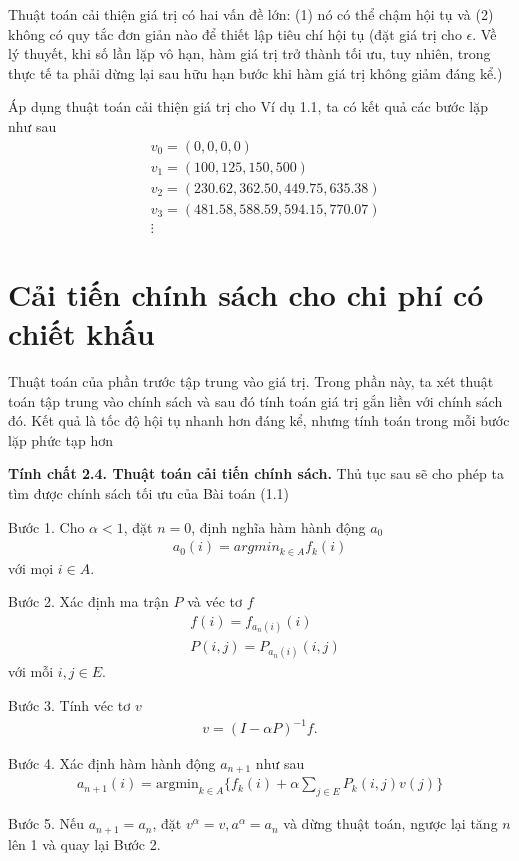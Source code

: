 \documentclass[12pt,a4paper]{report}
\begin{document}
  
   \selectfont
  Thuật toán cải thiện giá trị có hai vấn đề lớn: (1) nó có thể chậm hội tụ và (2) không có quy tắc đơn giản nào để thiết lập tiêu chí hội tụ (đặt giá trị cho $\epsilon$. Về lý thuyết, khi số lần lặp vô hạn, hàm giá trị trở thành tối ưu, tuy nhiên, trong thực tế ta phải dừng lại sau hữu hạn bước khi hàm giá trị không giảm đáng kể.)
  
  \medskip
  Áp dụng thuật toán cải thiện giá trị cho Ví dụ 1.1, ta có kết quả các bước lặp như sau
  \begin{align*}
  &v_0=(0,0,0,0)\\
  &v_1=(100,125,150,500)\\
  &v_2=(230.62, 362.50, 449.75, 635.38)\\
  &v_3=(481.58, 588.59, 594.15, 770.07)\\
  &\vdots
  \end{align*}
  
  \section{Cải tiến chính sách cho chi phí có chiết khấu}
  Thuật toán của phần trước tập trung vào giá trị. Trong phần này, ta xét thuật toán tập trung vào chính sách và sau đó tính toán giá trị gắn liền với chính sách đó. Kết quả là tốc độ hội tụ nhanh hơn đáng kể, nhưng tính toán trong mỗi bước lặp phức tạp hơn
  
  \begin{shaded*}
  	\noindent
  	\textbf{Tính chất 2.4. {Thuật toán cải tiến chính sách}.}
  	\selectfont 
  	Thủ tục sau sẽ cho phép ta tìm được chính sách tối ưu của Bài toán (1.1)
  	
  	\medskip
  	\noindent
  	Bước 1. Cho $\alpha <1$, đặt $n=0$, định nghĩa hàm hành động $a_0$
  	\begin{align*}
  	a_0(i)=argmin_{k \in A}f_k(i)
  	\end{align*}
  	với mọi $i \in A$.
  	
  	\medskip
  	\noindent
  	Bước 2. Xác định ma trận $P$ và véc tơ $f$
  	\begin{align*}
  	&f(i)=f_{a_n(i)}(i)\\
  	&P(i,j)=P_{a_n(i)}(i,j)
  	\end{align*} 
  	với mỗi $i,j \in E$.
  	
  	\medskip
  	\noindent
  	Bước 3. Tính véc tơ $v$
  	\begin{align*}
  	v=(I-\alpha P)^{-1}f.
  	\end{align*}
  	
  	\medskip
  	\noindent
  	Bước 4. Xác định hàm hành động $a_{n+1}$ như sau
  	\begin{align*}
  	a_{n+1}(i)=\mathrm{argmin}_{k \in A}\{f_k(i)+\alpha \sum_{j \in E}P_k(i,j)v(j)\}
  	\end{align*}
  	
  	\medskip
  	\noindent
  	Bước 5. Nếu $a_{n+1}=a_n$, đặt $v^\alpha =v, a^\alpha =a_n$ và dừng thuật toán, ngược lại tăng $n$ lên 1 và quay lại Bước 2. 
  	
  \end{shaded*}
  
\end{document}
